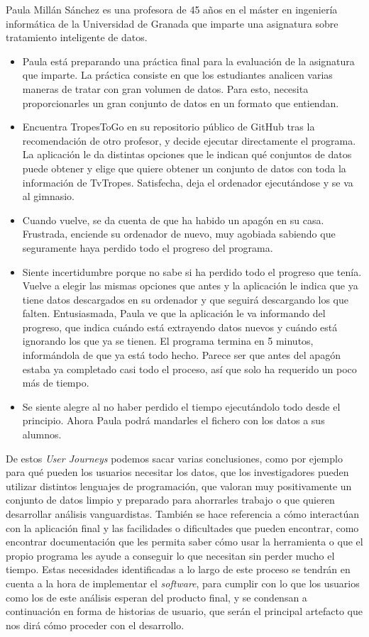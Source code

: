 Paula Millán Sánchez es una profesora de 45 años en el máster en ingeniería
informática de la Universidad de Granada que imparte una asignatura sobre
tratamiento inteligente de datos.

\begin{itemize}
    \item Paula está preparando una práctica final para la evaluación de la
    asignatura que imparte. La práctica consiste en que los estudiantes analicen
    varias maneras de tratar con gran volumen de datos. Para esto, necesita
    proporcionarles un gran conjunto de datos en un formato que entiendan.
    \item Encuentra TropesToGo en su repositorio público de GitHub tras la
    recomendación de otro profesor, y decide ejecutar directamente el programa.
    La aplicación le da distintas opciones que le indican qué conjuntos de datos
    puede obtener y elige que quiere obtener un conjunto de datos con toda la
    información de TvTropes. Satisfecha, deja el ordenador ejecutándose y se va
    al gimnasio.
    \item Cuando vuelve, se da cuenta de que ha habido un apagón en su casa.
    Frustrada, enciende su ordenador de nuevo, muy agobiada sabiendo que
    seguramente haya perdido todo el progreso del programa.
    \item Siente incertidumbre porque no sabe si ha perdido todo el progreso que
    tenía. Vuelve a elegir las mismas opciones que antes y la aplicación le
    indica que ya tiene datos descargados en su ordenador y que seguirá
    descargando los que falten. Entusiasmada, Paula ve que la aplicación le va
    informando del progreso, que indica cuándo está extrayendo datos nuevos y
    cuándo está ignorando los que ya se tienen. El programa termina en 5
    minutos, informándola de que ya está todo hecho. Parece ser que antes del
    apagón estaba ya completado casi todo el proceso, así que solo ha requerido
    un poco más de tiempo. 
    \item Se siente alegre al no haber perdido el tiempo ejecutándolo todo desde
    el principio. Ahora Paula podrá mandarles el fichero con los datos a sus
    alumnos.
\end{itemize}

De estos \textit{User Journeys} podemos sacar varias conclusiones, como por
ejemplo para qué pueden los usuarios necesitar los datos, que los investigadores
pueden utilizar distintos lenguajes de programación, que valoran muy
positivamente un conjunto de datos limpio y preparado para ahorrarles trabajo o
que quieren desarrollar análisis vanguardistas. También se hace referencia a
cómo interactúan con la aplicación final y las facilidades o dificultades que
pueden encontrar, como encontrar documentación que les permita saber cómo usar
la herramienta o que el propio programa les ayude a conseguir lo que necesitan
sin perder mucho el tiempo. Estas necesidades identificadas a lo largo de este
proceso se tendrán en cuenta a la hora de implementar el \textit{software}, para
cumplir con lo que los usuarios como los de este análisis esperan del producto
final, y se condensan a continuación en forma de historias de usuario, que serán
el principal artefacto que nos dirá cómo proceder con el desarrollo.

